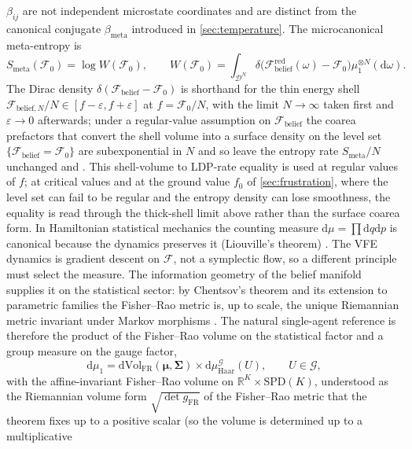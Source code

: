 \documentclass[11pt]{article}
\theoremstyle{plain}
\theoremstyle{definition}
\newcommand{\R}{\mathbb{R}}
\newcommand{\SPD}{\mathrm{SPD}}
\newcommand{\dd}{\mathrm{d}}
\newcommand{\bmu}{\boldsymbol{\mu}}
\newcommand{\bSigma}{\boldsymbol{\Sigma}}
\newcommand{\Fcal}{\mathcal{F}}
\newcommand{\Dcal}{\mathcal{D}}
\newcommand{\Gcal}{\mathcal{G}}
\newcommand{\Wmeta}{W}
\newcommand{\Smeta}{S_{\mathrm{meta}}}
\newcommand{\bmeta}{\beta_{\mathrm{meta}}}
\newcommand{\betaij}{\beta_{ij}}
\newcommand{\veps}{\varepsilon}
\begin{document}
$\betaij$ are not independent microstate coordinates and are distinct from the canonical conjugate
$\bmeta$ introduced in \cref{sec:temperature}. The
microcanonical meta-entropy is
\begin{equation}
\label{eq:Smicro}
\Smeta(\Fcal_0)=\log\Wmeta(\Fcal_0),\qquad
\Wmeta(\Fcal_0)=\int_{\Dcal^{N}}\delta\bigl(\Fcal_{\mathrm{belief}}^{\mathrm{red}}(\omega)-\Fcal_0\bigr)\mu_1^{\otimes N}(\dd\omega).
\end{equation}
The Dirac density $\delta(\Fcal_{\mathrm{belief}}-\Fcal_0)$ is shorthand for the thin energy shell
$\Fcal_{\mathrm{belief},N}/N\in[f-\veps,f+\veps]$ at $f=\Fcal_0/N$, with the limit $N\to\infty$ taken first
and $\veps\to0$ afterwards; under a regular-value assumption on $\Fcal_{\mathrm{belief}}$ the coarea prefactors
that convert the shell volume into a surface density on the level set $\{\Fcal_{\mathrm{belief}}=\Fcal_0\}$ are
subexponential in $N$ and so leave the entropy rate $\Smeta/N$ unchanged
\citep[\S5.4]{touchette2009large} and \citep{ellis1985entropy}. This shell-volume to LDP-rate
equality is used at regular values of $f$; at critical values and at the ground value $f_0$ of
\cref{sec:frustration}, where the level set can fail to be regular and the entropy density can lose
smoothness, the equality is read through the thick-shell limit above rather than the surface coarea form.
In Hamiltonian statistical mechanics the counting measure $\dd\mu=\prod \dd q \dd p$ is
canonical because the dynamics preserves it (Liouville's theorem)
\citep{goldstein1980classical}. The VFE dynamics is gradient descent on $\Fcal$, not a
symplectic flow, so a different principle must select the measure. The information
geometry of the belief manifold supplies it on the statistical sector: by Chentsov's
theorem and its extension to parametric families the Fisher--Rao metric is, up to scale,
the unique Riemannian metric invariant under Markov morphisms
\citep{chentsov1982statistical,amari2000methods,nielsen2020elementary}. The natural
single-agent reference is therefore the product of the Fisher--Rao volume on the
statistical factor and a group measure on the gauge factor,
\begin{equation}
\label{eq:measure}
\dd\mu_1=\dd\mathrm{Vol}_{\mathrm{FR}}(\bmu,\bSigma)\times\dd\mu_{\mathrm{Haar}}^{\Gcal}(U),
\qquad U\in\Gcal,
\end{equation}
with the affine-invariant Fisher--Rao volume on $\R^{K}\times\SPD(K)$, understood as the
Riemannian volume form $\sqrt{\det g_{\mathrm{FR}}}$ of the Fisher--Rao metric that the
theorem fixes up to a positive scalar (so the volume is determined up to a multiplicative
\end{document}
